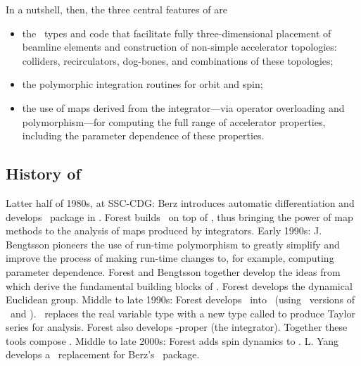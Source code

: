 %
In a nutshell, then, the three central features of \PTC%
 are
\begin{itemize}
  \item the \Fninety\ types and code that facilitate fully three-dimensional
        placement of beamline elements and construction of non-simple
        accelerator topologies: colliders, recirculators, dog-bones,
        and combinations of these topologies;
  \item the polymorphic integration routines for orbit and spin;
  \item the use of maps derived from the integrator---via operator
        overloading and polymorphism---for computing the full range
        of accelerator properties, including the parameter dependence
        of these properties.
\end{itemize}

\subsection{History of \PTC}

Latter half of 1980s, at SSC-CDG: Berz introduces automatic
differentiation and develops \DA\ package in \Fsevens.
Forest builds \LieLib\ on top of \DA, thus bringing the power
of map methods to the analysis of maps produced by integrators.
Early 1990s: J. Bengtsson pioneers the use of run-time polymorphism
to greatly simplify and improve the process of making run-time
changes to, for example, computing parameter dependence.
Forest and Bengtsson together develop the ideas from which derive
the fundamental building blocks of \PTC. Forest develops the
dynamical Euclidean group.
Middle to late 1990s: Forest develops \LieLib\ into \FPP\
(using \LBNL\ versions of \DA\ and \LieLib).
\FPP\ replaces the real variable type  with a new type
called \ptc{real_8} to produce Taylor series for analysis.
Forest also develops \PTC-proper (the integrator).
Together these tools compose \PTC.
Middle to late 2000s: Forest adds spin dynamics to \PTC.
L. Yang develops a \Cpp\ replacement for Berz's \DA\ package.

